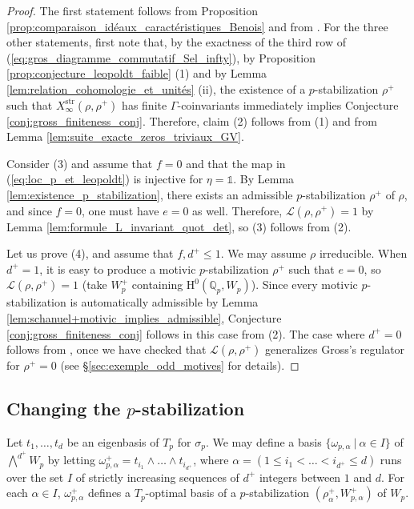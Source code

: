 \documentclass[12pt]{amsart}
\newcommand\Qp{{\mathbb{Q}_p}}
\newcommand\cL{\mathcal{L}}
\newcommand{\str}{\mathrm{str}}
\newcommand{\HH}{\mathrm{H}}
\theoremstyle{defstyle}
\theoremstyle{thmstyle}
\begin{document}
\begin{proof}
	The first statement follows from Proposition \ref{prop:comparaison_idéaux_caractéristiques_Benois} and from \cite[Thm. 5 (i)]{benoiscrys}. For the three other statements, first note that, by the exactness of the third row of (\ref{eq:gros_diagramme_commutatif_Sel_infty}), by Proposition \ref{prop:conjecture_leopoldt_faible} (1) and by Lemma \ref{lem:relation_cohomologie_et_unités} (ii), the existence of a $p$-stabilization $\rho^+$ such that $X_\infty^\str(\rho,\rho^+)$ has finite $\Gamma$-coinvariants immediately implies Conjecture \ref{conj:gross_finiteness_conj}. Therefore, claim (2) follows from (1) and from Lemma \ref{lem:suite_exacte_zeros_triviaux_GV}. 
	
	Consider (3) and assume that $f=0$ and that the map in (\ref{eq:loc_p_et_leopoldt}) is injective for $\eta=\mathds{1}$. By Lemma \ref{lem:existence_p_stabilization}, there exists an admissible $p$-stabilization $\rho^+$ of $\rho$, and since $f=0$, one must have $e=0$ as well. Therefore, $\cL(\rho,\rho^+)=1$ by Lemma \ref{lem:formule_L_invariant_quot_det}, so (3) follows from (2). 
	
	Let us prove (4), and assume that $f,d^+\leq 1$. We may assume $\rho$ irreducible. When $d^+=1$, it is easy to produce a motivic $p$-stabilization $\rho^+$ such that $e=0$, so $\cL(\rho,\rho^+)=1$ (take $W_p^+$ containing $\HH^0(\Qp,W_p)$). Since every motivic $p$-stabilization is automatically admissible by Lemma \ref{lem:schanuel+motivic_implies_admissible}, Conjecture \ref{conj:gross_finiteness_conj} follows in this case from (2). The case where $d^+=0$ follows from \cite[Prop. 2.13]{gross1981padic}, once we have checked that $\cL(\rho,\rho^+)$ generalizes Gross's regulator for $\rho^+=0$ (see \S\ref{sec:exemple_odd_motives} for details).
\end{proof}


\subsection{Changing the $p$-stabilization}\label{sec:changement_p_stabilisation}
Let $t_1,\ldots,t_d$ be an eigenbasis of $T_p$ for $\sigma_p$. We may define a basis $\{\omega_{p,\alpha}\ | \ \alpha\in I\}$ of ${\bigwedge}^{d^+}W_p$ by letting $\omega_{p,\alpha}^+=t_{i_1}\wedge\ldots\wedge t_{i_{d^+}}$, where $\alpha=(1\leq i_{1}< \ldots< i_{d^+}\leq d)$ runs over the set $I$ of strictly increasing sequences of $d^+$ integers between $1$ and $d$. For each $\alpha\in I$, $\omega_{p,\alpha}^+$ defines a $T_p$-optimal basis of a $p$-stabilization $(\rho_\alpha^+,W_{p,\alpha}^+)$ of $W_p$. 
\end{document}
